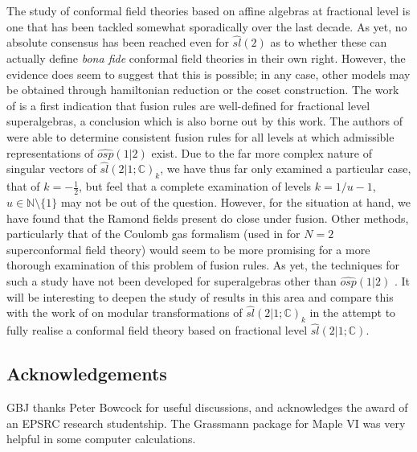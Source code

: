 \documentclass[a4paper,12pt]{article}
\def\N           {\mathbb N}
\def\hslc        {\hat{sl}(2|1;{\mathbb C})}
\def\hslck       {\hat{sl}(2|1;{\mathbb C})_k}
\def\hf          {\tfrac{1}{2}}
\begin{document}
The study of conformal field theories based on affine algebras at
fractional level is one that has been tackled somewhat sporadically
over the last decade.  As yet, no absolute consensus has been reached
even for $\hat{sl}(2)$ as to whether these can actually define {\em bona
fide} conformal field theories in their own right.  However, the   
evidence does seem to suggest that this is possible; in any case, 
other models may be obtained through hamiltonian reduction or the
coset construction.  The work of \cite{ER} is a first indication that
fusion rules are well-defined for fractional level superalgebras, a
conclusion which is also borne out by this work.  The authors of
\cite{ER} were able to determine consistent fusion rules for all
levels at which admissible representations of $\widehat{osp}(1|2)$
exist.  Due to the far more complex nature of singular vectors of
$\hslck$, we have thus far only examined a particular case, that of
$k=-\hf$, but feel that a complete examination of levels $k=1/u-1$,
$u \in \N \setminus \{1\}$ may not be out of the question.  However, for
the situation at
hand, we have found that the Ramond fields present do close under
fusion.  Other methods, particularly that of the Coulomb gas formalism 
(used in \cite{MSS} for $N=2$ superconformal field theory) would seem to 
be more promising for a more thorough examination of this problem of fusion 
rules.  As yet, the techniques for such a study have not been developed for 
superalgebras other than $\widehat{osp}(1|2)$ \cite{Ras}.
It will be interesting to deepen the study of results in
this area and compare this with the work of \cite{GBJ} on modular
transformations of $\hslck$ in the attempt to fully realise a conformal
field theory based on fractional level $\hslc$.


\subsection*{Acknowledgements}

GBJ thanks Peter Bowcock for useful discussions, and acknowledges the award 
of an EPSRC research studentship.  The Grassmann package for Maple VI 
\cite{CT} was very helpful in some computer calculations.

\def\NPB{Nucl.\ Phys.\ B } 
\def\CMP{Commun.\ Math.\ Phys.\ }  
\end{document}

